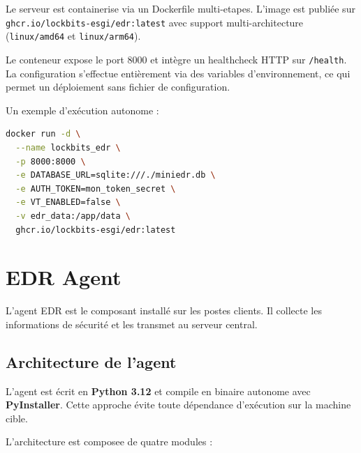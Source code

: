 Le serveur est containerise via un Dockerfile multi-etapes. L'image est
publiée sur \texttt{ghcr.io/lockbits-esgi/edr:latest} avec support
multi-architecture (\texttt{linux/amd64} et \texttt{linux/arm64}).

Le conteneur expose le port 8000 et intègre un healthcheck HTTP sur
\texttt{/health}. La configuration s'effectue entièrement via des
variables d'environnement, ce qui permet un déploiement sans fichier de
configuration.

Un exemple d'exécution autonome :

\begin{lstlisting}[language=bash, caption={Execution du serveur EDR avec Docker}, label={lst:edr-docker}]
docker run -d \
  --name lockbits_edr \
  -p 8000:8000 \
  -e DATABASE_URL=sqlite:///./miniedr.db \
  -e AUTH_TOKEN=mon_token_secret \
  -e VT_ENABLED=false \
  -v edr_data:/app/data \
  ghcr.io/lockbits-esgi/edr:latest
\end{lstlisting}


\section{EDR Agent}

L'agent EDR est le composant installé sur les postes clients. Il collecte
les informations de sécurité et les transmet au serveur central.

\subsection{Architecture de l'agent}

L'agent est écrit en \textbf{Python 3.12} et compile en binaire autonome
avec \textbf{PyInstaller}. Cette approche évite toute dépendance
d'exécution sur la machine cible.

L'architecture est composee de quatre modules :

